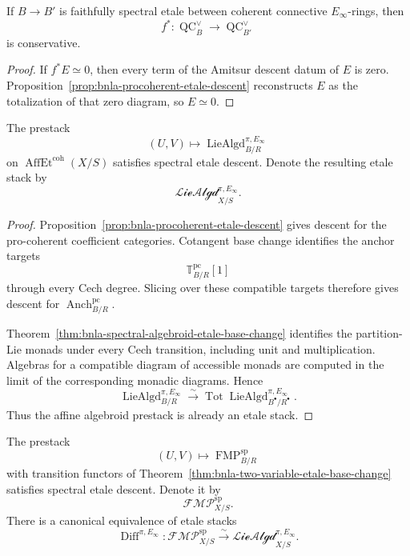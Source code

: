 \begin{corollary}
\label{cor:bnla-procoherent-etale-conservative}
If $B\to B'$ is faithfully spectral etale between coherent connective
$E_\infty$-rings, then
\[
    f^*:\operatorname{QC}^{\vee}_B
    \longrightarrow
    \operatorname{QC}^{\vee}_{B'}
\]
is conservative.
\end{corollary}

\begin{proof}
If $f^*E\simeq0$, then every term of the Amitsur descent datum of $E$ is zero.
Proposition~\ref{prop:bnla-procoherent-etale-descent} reconstructs $E$ as the
totalization of that zero diagram, so $E\simeq0$.
\end{proof}

\begin{proposition}
\label{prop:bnla-spectral-algebroid-etale-descent}
The prestack
\[
    (U,V)
    \longmapsto
    \operatorname{LieAlgd}^{\pi,E_\infty}_{B/R}
\]
on $\operatorname{AffEt}^{\mathrm{coh}}(X/S)$ satisfies spectral etale
descent.  Denote the resulting etale stack by
\[
    \mathscr{LieAlgd}^{\pi,E_\infty}_{X/S}.
\]
\end{proposition}

\begin{proof}
Proposition~\ref{prop:bnla-procoherent-etale-descent} gives descent for the
pro-coherent coefficient categories.  Cotangent base change identifies the
anchor targets
\[
    \mathbb T^{\mathrm{pc}}_{B/R}[1]
\]
through every Cech degree.  Slicing over these compatible targets therefore
gives descent for
$\operatorname{Anch}^{\mathrm{pc}}_{B/R}$.

Theorem~\ref{thm:bnla-spectral-algebroid-etale-base-change} identifies the
partition-Lie monads under every Cech transition, including unit and
multiplication.  Algebras for a compatible diagram of accessible monads are
computed in the limit of the corresponding monadic diagrams.  Hence
\[
\boxed{
    \operatorname{LieAlgd}^{\pi,E_\infty}_{B/R}
    \xrightarrow{\sim}
    \operatorname*{Tot}
    \operatorname{LieAlgd}^{\pi,E_\infty}_{B^\bullet/R^\bullet}.}
\]
Thus the affine algebroid prestack is already an etale stack.
\end{proof}

\begin{theorem}
\label{thm:bnla-global-fmp-localization}
The prestack
\[
    (U,V)\longmapsto
    \operatorname{FMP}^{\mathrm{sp}}_{B/R}
\]
with transition functors of
Theorem~\ref{thm:bnla-two-variable-etale-base-change} satisfies spectral
etale descent.  Denote it by
\[
    \mathscr{FMP}^{\mathrm{sp}}_{X/S}.
\]
There is a canonical equivalence of etale stacks
\[
\boxed{
    \operatorname{Diff}^{\pi,E_\infty}:
    \mathscr{FMP}^{\mathrm{sp}}_{X/S}
    \xrightarrow{\sim}
    \mathscr{LieAlgd}^{\pi,E_\infty}_{X/S}.}
\]
\end{theorem}

